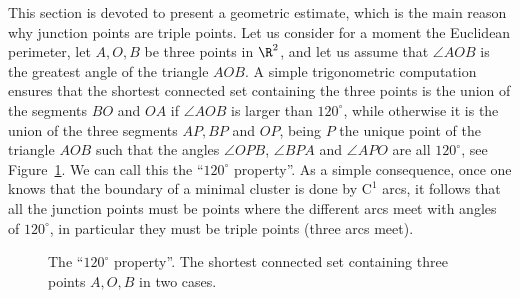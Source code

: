 This section is devoted to present a geometric estimate, which is the main reason why junction points are triple points. Let us consider for a moment the Euclidean perimeter, let $A,O,B$ be three points in $\R^2$, and let us assume that $\angle AOB$ is the greatest angle of the triangle $AOB$. A simple trigonometric computation ensures that the shortest connected set containing the three points is the union of the segments $BO$ and $OA$ if $\angle AOB$ is larger than $120^\circ$, while otherwise it is the union of the three segments $AP, BP$ and $OP$, being $P$ the unique point of the triangle $AOB$ such that the angles $\angle OPB$, $\angle BPA$ and $\angle APO$ are all $120^\circ$, see Figure~\ref{Fig120}. We can call this the ``$120^\circ$ property''. As a simple consequence, once one knows that the boundary of a minimal cluster is done by $\mathrm{C}^1$ arcs, it follows that all the junction points must be points where the different arcs meet with angles of $120^\circ$, in particular they must be triple points (\ie three arcs meet).\par
\begin{figure}[htbp]
\caption{The ``$120^\circ$ property''. The shortest connected set containing three points $A, O,B$ in two cases.}\label{Fig120}
\end{figure}
